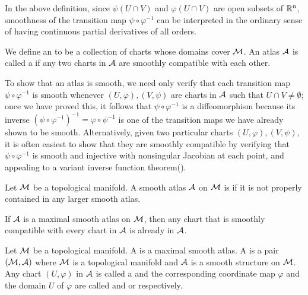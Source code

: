\documentclass[11pt,a4paper]{article}
\begin{document}
\begin{remark}
In the above definition, since $\psi(U\cap V)$ and $\varphi(U\cap V)$ are open subsets of $\mathbb{R}^n$, smoothness of the transition map $\psi\circ\varphi^{-1}$ can be interpreted in the ordinary sense of having continuous partial derivatives of all orders.
\end{remark}

\begin{definition}
We define an  to be a collection of charts whose domains cover $\mathcal{M}$. An atlas $\mathcal{A}$ is called a  if any two charts in $\mathcal{A}$ are smoothly compatible with each other.
\end{definition}

\begin{remark}
To show that an atlas is smooth, we need only verify that each transition map $\psi\circ\varphi^{-1}$ is smooth whenever $(U,\varphi), (V,\psi)$ are charts in $\mathcal{A}$ such that $U\cap V\neq \emptyset$; once we have proved this, it follows that $\psi\circ\varphi^{-1}$ is a diffeomorphism because its  inverse $(\psi\circ\varphi^{-1})^{-1} = \varphi\circ\psi^{-1}$ is one of the transition maps we have already shown to be smooth. Alternatively, given two particular charts $(U,\varphi), (V,\psi)$, it is often easiest to show that they are smoothly compatible by verifying that $\psi\circ\varphi^{-1}$ is smooth and injective with nonsingular Jacobian at each point, and appealing to a variant inverse function theorem(\cite[Corollary C.36]{JohnLee}).
\end{remark}

\begin{definition}
Let $\mathcal{M}$ be a topological manifold. A smooth atlas $\mathcal{A}$ on $\mathcal{M}$ is  if it is not properly contained in any larger smooth atlas.
\end{definition}

\begin{remark}
If $\mathcal{A}$ is a maximal smooth atlas on $\mathcal{M}$, then any chart that is smoothly compatible with every chart in $\mathcal{A}$ is already in $\mathcal{A}$.
\end{remark}

\begin{definition}
Let $\mathcal{M}$ be a topological manifold. A  is a maximal smooth atlas. A  is a pair $(\mathcal{M},\mathcal{A})$ where $\mathcal{M}$ is a topological manifold and $\mathcal{A}$ is a smooth structure on $\mathcal{M}$. Any chart $(U,\varphi)$ in $\mathcal{A}$ is called a  and the corresponding coordinate map $\varphi$ and the domain $U$ of $\varphi$ are called  and  or  respectively.
\end{definition}
\end{document}
